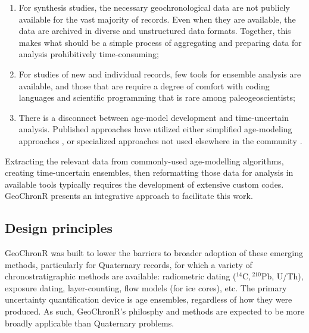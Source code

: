 \documentclass[gchron, manuscript]{copernicus}
\begin{document}
\begin{enumerate}
\def\labelenumi{\arabic{enumi}.}
\item
  For synthesis studies, the necessary geochronological data are not publicly available for the vast majority of records. Even when they are available, the data are archived in diverse and unstructured data formats. Together, this makes what should be a simple process of aggregating and preparing data for analysis prohibitively time-consuming;
\item
  For studies of new and individual records, few tools for ensemble analysis are available, and those that are require a degree of comfort with coding languages and scientific programming that is rare among paleogeoscientists;
\item
  There is a disconnect between age-model development and time-uncertain analysis. Published approaches have utilized either simplified age-modeling approaches \citep[e.g,][\citet{routson2018}]{Haam_Huybers2010}, or specialized approaches not used elsewhere in the community \citep[\citet{Tierney2013}, update with newer]{Marcott_Science2013}.
\end{enumerate}

Extracting the relevant data from commonly-used age-modelling algorithms, creating time-uncertain ensembles, then reformatting those data for analysis in available tools typically requires the development of extensive custom codes.
GeoChronR presents an integrative approach to facilitate this work.

\subsection{Design principles}

GeoChronR was built to lower the barriers to broader adoption of these emerging methods, particularly for Quaternary records, for which a variety of chronostratigraphic methods are available: radiometric dating (\({}^{14}\mathrm{C}, {}^{210}\mathrm{Pb}\), U/Th), exposure dating, layer-counting, flow models (for ice cores), etc. The primary uncertainty quantification device is age ensembles, regardless of how they were produced. As such, GeoChronR's philosphy and methods are expected to be more broadly applicable than Quaternary problems.
\end{document}
